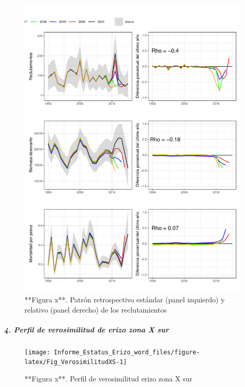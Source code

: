 \documentclass[
]{article}
\begin{document}
\begin{figure}

{\centering \includegraphics{Figuras/Fig_RetrospectivoXS-1} 

}

\caption{**Figura x**.  Patrón retrospectivo estándar (panel izquierdo) y  relativo (panel derecho) de los reclutamientos}\label{fig:Fig_RetrospectivoXS}
\end{figure}

\hypertarget{perfil-de-verosimilitud-de-erizo-zona-x-sur}{%
\subparagraph{\texorpdfstring{\textbf{\emph{4. Perfil de verosimilitud
de erizo zona X
sur}}}{4. Perfil de verosimilitud de erizo zona X sur}}\label{perfil-de-verosimilitud-de-erizo-zona-x-sur}}

\begin{figure}

{\centering \texttt{[image: Informe\_Estatus\_Erizo\_word\_files/figure-latex/Fig\_VerosimilitudXS-1]} 

}

\caption{**Figura x**.  Perfil de verosimilitud erizo zona X sur}\label{fig:Fig_VerosimilitudXS}
\end{figure}
\end{document}
